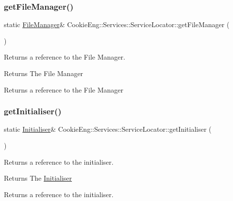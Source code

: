 \subsubsection{\texorpdfstring{get\+File\+Manager()}{getFileManager()}}
{\footnotesize\ttfamily static \hyperlink{class_cookie_eng_1_1_services_1_1_file_manager}{File\+Manager}\& Cookie\+Eng\+::\+Services\+::\+Service\+Locator\+::get\+File\+Manager (\begin{DoxyParamCaption}{ }\end{DoxyParamCaption})\hspace{0.3cm}{\ttfamily [static]}}



Returns a reference to the File Manager. 

\begin{DoxyReturn}{Returns}
The File Manager
\end{DoxyReturn}
Returns a reference to the File Manager \mbox{\label{class_cookie_eng_1_1_services_1_1_service_locator_af235353d13e544fe474d6908ef4f96fb}} 
\subsubsection{\texorpdfstring{get\+Initialiser()}{getInitialiser()}}
{\footnotesize\ttfamily static \hyperlink{class_cookie_eng_1_1_services_1_1_initialiser}{Initialiser}\& Cookie\+Eng\+::\+Services\+::\+Service\+Locator\+::get\+Initialiser (\begin{DoxyParamCaption}{ }\end{DoxyParamCaption})\hspace{0.3cm}{\ttfamily [static]}}



Returns a reference to the initialiser. 

\begin{DoxyReturn}{Returns}
The \hyperlink{class_cookie_eng_1_1_services_1_1_initialiser}{Initialiser}
\end{DoxyReturn}
Returns a reference to the initialiser. \mbox{\label{class_cookie_eng_1_1_services_1_1_service_locator_a3acc403cde719caada08b5cf9327ad24}} 
